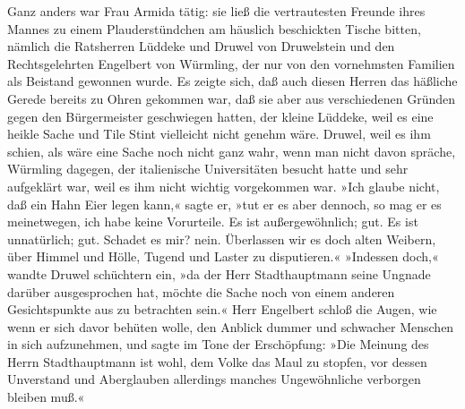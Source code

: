 Ganz anders war Frau Armida tätig: sie ließ die vertrautesten
Freunde ihres Mannes zu einem Plauderstündchen am häuslich
beschickten Tische bitten, nämlich die Ratsherren Lüddeke und
Druwel von Druwelstein und den Rechtsgelehrten Engelbert von
Würmling, der nur von den\pagenum{[14]} vornehmsten Familien als
Beistand gewonnen wurde. Es zeigte sich, daß auch diesen Herren das
häßliche Gerede bereits zu Ohren gekommen war, daß sie aber aus
verschiedenen Gründen gegen den Bürgermeister geschwiegen hatten,
der kleine Lüddeke, weil es eine heikle Sache und Tile Stint
vielleicht nicht genehm wäre. Druwel, weil es ihm schien, als wäre
eine Sache noch nicht ganz wahr, wenn man nicht davon spräche,
Würmling dagegen, der italienische Universitäten besucht hatte und
sehr aufgeklärt war, weil es ihm nicht wichtig vorgekommen war.
»Ich glaube nicht, daß ein Hahn Eier legen kann,« sagte er, »tut er
es aber dennoch, so mag er es meinetwegen, ich habe keine
Vorurteile. Es ist außergewöhnlich; gut. Es ist unnatürlich; gut.
Schadet es mir? nein. Überlassen wir es doch alten Weibern, über
Himmel und Hölle, Tugend und Laster zu disputieren.« »Indessen
doch,« wandte Druwel schüchtern ein, »da der Herr Stadthauptmann
seine Ungnade darüber ausgesprochen hat, möchte die Sache noch von
einem anderen Gesichtspunkte aus zu betrachten sein.« Herr
Engelbert schloß die Augen, wie wenn er sich davor behüten wolle,
den Anblick dummer und schwacher Menschen in sich aufzunehmen, und
sagte im Tone der Erschöpfung: »Die Meinung des Herrn
Stadthauptmann ist wohl, dem Volke das Maul zu stopfen, vor dessen
Unverstand und Aberglauben allerdings manches Ungewöhnliche
verborgen bleiben muß.«

